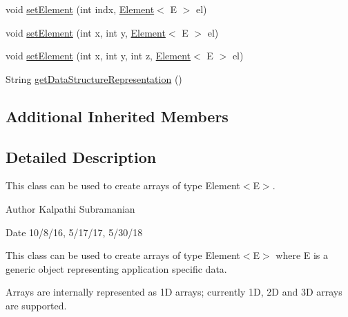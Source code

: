 \begin{DoxyCompactItemize}
\item 
void \hyperlink{classbridges_1_1base_1_1_array_aafde1304d602e8b0f673dd61bc00c18f}{set\+Element} (int indx, \hyperlink{classbridges_1_1base_1_1_element}{Element}$<$ E $>$ el)
\item 
void \hyperlink{classbridges_1_1base_1_1_array_a5e43e6d56cfeaf6a1b193b0ea16f7696}{set\+Element} (int x, int y, \hyperlink{classbridges_1_1base_1_1_element}{Element}$<$ E $>$ el)
\item 
void \hyperlink{classbridges_1_1base_1_1_array_adce72de13986516fb3130113d85dbe36}{set\+Element} (int x, int y, int z, \hyperlink{classbridges_1_1base_1_1_element}{Element}$<$ E $>$ el)
\item 
String \hyperlink{classbridges_1_1base_1_1_array_a111592e8b75202064bdf06d9c2234d74}{get\+Data\+Structure\+Representation} ()
\end{DoxyCompactItemize}
\subsection*{Additional Inherited Members}


\subsection{Detailed Description}
This class can be used to create arrays of type Element$<$\+E$>$. 

\begin{DoxyAuthor}{Author}
Kalpathi Subramanian
\end{DoxyAuthor}
\begin{DoxyDate}{Date}
10/8/16, 5/17/17, 5/30/18
\end{DoxyDate}
This class can be used to create arrays of type Element$<$\+E$>$ where E is a generic object representing application specific data.

Arrays are internally represented as 1\+D arrays; currently 1\+D, 2\+D and 3\+D arrays are supported.



